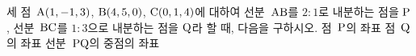 세 점~$\mathrm{A}(1{,}\mkern3mu\mathopen{}-1{,}\mkern3mu\mathopen{}3)$, $\mathrm{B}(4{,}\mkern3mu\mathopen{}5{,}\mkern3mu\mathopen{}0)$, $\mathrm{C}(0{,}\mkern3mu\mathopen{}1{,}\mkern3mu\mathopen{}4)$에 대하여 선분~$\mathrm{AB}$를 $2:1$로 내분하는 점을 $\mathrm{P}$, 선분~$\mathrm{BC}$를 $1:3$으로 내분하는 점을 $\mathrm{Q}$라 할 때, 다음을 구하시오.
 점~$\mathrm{P}$의 좌표
 점~$\mathrm{Q}$의 좌표
 선분~$\mathrm{PQ}$의 중점의 좌표
